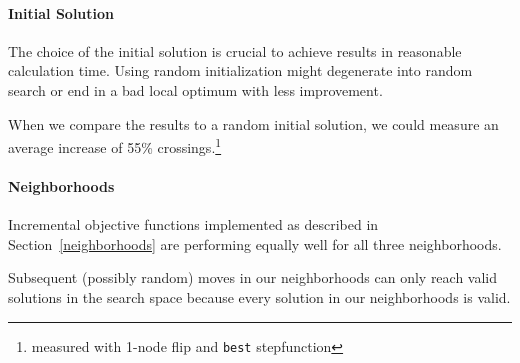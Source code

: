 \documentclass{scrartcl}
\begin{document}
\paragraph{Initial Solution}
The choice of the initial solution is crucial to achieve results in
reasonable calculation time.  Using random initialization might
degenerate into random search or end in a bad local optimum with less
improvement.



When we compare the results to a random initial solution, we could
measure an average increase of 55\% crossings.\footnote{measured with 1-node flip and \texttt{best} stepfunction}
%

%




\paragraph{Neighborhoods}
Incremental objective functions implemented as described in Section~\ref{neighborhoods}
are performing equally well for all three neighborhoods.

Subsequent (possibly random) moves in our neighborhoods can only reach
valid solutions in the search space because every solution in our neighborhoods
is valid.
\end{document}
